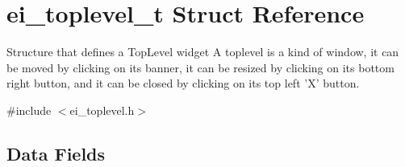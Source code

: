 \hypertarget{structei__toplevel__t}{\section{ei\+\_\+toplevel\+\_\+t Struct Reference}
\label{structei__toplevel__t}
}


Structure that defines a Top\+Level widget A toplevel is a kind of window, it can be moved by clicking on its banner, it can be resized by clicking on its bottom right button, and it can be closed by clicking on its top left 'X' button.  




{\ttfamily \#include $<$ei\+\_\+toplevel.\+h$>$}

\subsection*{Data Fields}

